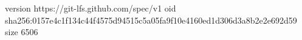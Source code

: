 version https://git-lfs.github.com/spec/v1
oid sha256:0157e4c1f134c44f4575d94515c5a05fa9f10e4160ed1d306d3a8b2e2e692d59
size 6506
